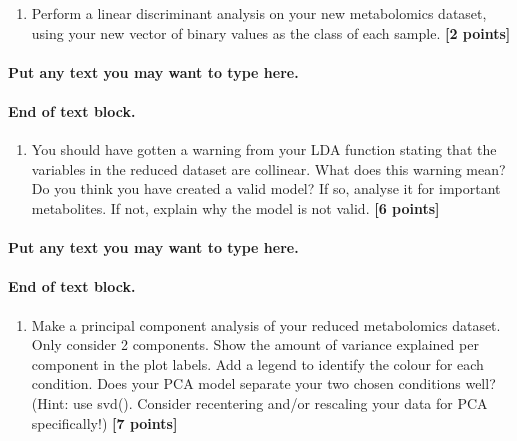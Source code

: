 \documentclass[
]{article}
\providecommand{\tightlist}{%
  \setlength{\itemsep}{0pt}\setlength{\parskip}{0pt}}
\begin{document}
\begin{enumerate}
\def\labelenumi{\Alph{enumi})}
\setcounter{enumi}{1}
\tightlist
\item
  Perform a linear discriminant analysis on your new metabolomics
  dataset, using your new vector of binary values as the class of each
  sample. \textbf{{[}2 points{]}}
\end{enumerate}

\hypertarget{put-any-text-you-may-want-to-type-here.-27}{%
\paragraph{Put any text you may want to type
here.}\label{put-any-text-you-may-want-to-type-here.-27}}

\hypertarget{end-of-text-block.-29}{%
\paragraph{End of text block.}\label{end-of-text-block.-29}}

\begin{enumerate}
\def\labelenumi{\Alph{enumi})}
\setcounter{enumi}{2}
\tightlist
\item
  You should have gotten a warning from your LDA function stating that
  the variables in the reduced dataset are collinear. What does this
  warning mean? Do you think you have created a valid model? If so,
  analyse it for important metabolites. If not, explain why the model is
  not valid. \textbf{{[}6 points{]}}
\end{enumerate}

\hypertarget{put-any-text-you-may-want-to-type-here.-28}{%
\paragraph{Put any text you may want to type
here.}\label{put-any-text-you-may-want-to-type-here.-28}}

\hypertarget{end-of-text-block.-30}{%
\paragraph{End of text block.}\label{end-of-text-block.-30}}

\begin{enumerate}
\def\labelenumi{\Alph{enumi})}
\setcounter{enumi}{3}
\tightlist
\item
  Make a principal component analysis of your reduced metabolomics
  dataset. Only consider 2 components. Show the amount of variance
  explained per component in the plot labels. Add a legend to identify
  the colour for each condition. Does your PCA model separate your two
  chosen conditions well? (Hint: use svd(). Consider recentering and/or
  rescaling your data for PCA specifically!) \textbf{{[}7 points{]}}
\end{enumerate}
\end{document}
